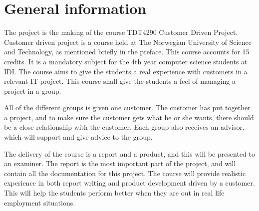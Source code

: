 \section{General information}

The project is the making of the course TDT4290 Customer Driven Project. 
Customer driven project is a course held at The Norwegian University of Science and Technology, as mentioned briefly in the preface. 
This course accounts for 15 credits. 
It is a mandatory subject for the 4th year computer science students at IDI. 
The course aims to give the students a real experience with customers in a relevant IT-project. 
This course shall give the students a feel of managing a project in a group. 


All of the different groups is given one customer. 
The customer has put together a project, and to make sure the customer gets what he or she wants, there should be a close relationship with the customer.
Each group also receives an advisor, which will support and give advice to the group. 


The delivery of the course is a report and a product, and this will be presented to an examiner. 
The report is the most important part of the project, and will contain all the documentation for this project. The course will provide realistic experience in both report writing and product development driven by a customer. 
This will help the students perform better when they are out in real life employment situations.

